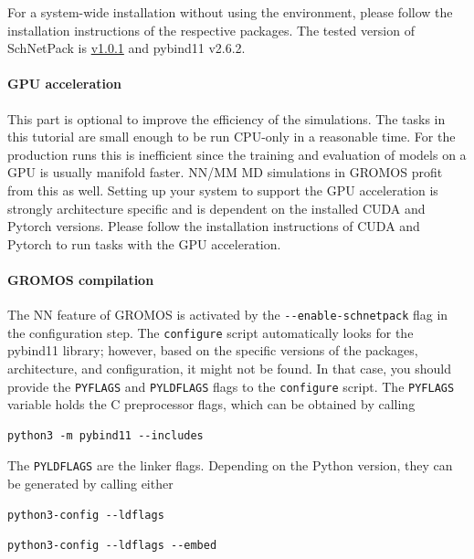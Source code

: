 For a system-wide installation without using the environment, please follow the installation instructions of the respective packages. The tested version of SchNetPack is \href{https://github.com/atomistic-machine-learning/schnetpack/releases/tag/v1.0.1}{v1.0.1} and pybind11 v2.6.2.

\paragraph{GPU acceleration}
This part is optional to improve the efficiency of the simulations. The tasks in this tutorial are small enough to be run CPU-only in a reasonable time. For the production runs this is inefficient since the training and evaluation of models on a GPU is usually manifold faster. NN/MM MD simulations in GROMOS profit from this as well. Setting up your system to support the GPU acceleration is strongly architecture specific and is dependent on the installed CUDA and Pytorch versions. Please follow the installation instructions of CUDA and Pytorch to run tasks with the GPU acceleration.

\paragraph{GROMOS compilation}
The NN feature of GROMOS is activated by the \texttt{-{}-enable-schnetpack} flag in the configuration step. The \texttt{configure} script automatically looks for the pybind11 library; however, based on the specific versions of the packages, architecture, and configuration, it might not be found. In that case, you should provide the \texttt{PYFLAGS} and \texttt{PYLDFLAGS} flags to the \texttt{configure} script. The \texttt{PYFLAGS} variable holds the C preprocessor flags, which can be obtained by calling

\begin{lstlisting}[breaklines=true, breakatwhitespace=false]
python3 -m pybind11 --includes
\end{lstlisting}

The \texttt{PYLDFLAGS} are the linker flags. Depending on the Python version, they can be generated by calling either 

\begin{lstlisting}[breaklines=true, breakatwhitespace=false]
python3-config --ldflags
\end{lstlisting}


\begin{lstlisting}[breaklines=true, breakatwhitespace=false]
python3-config --ldflags --embed
\end{lstlisting}

